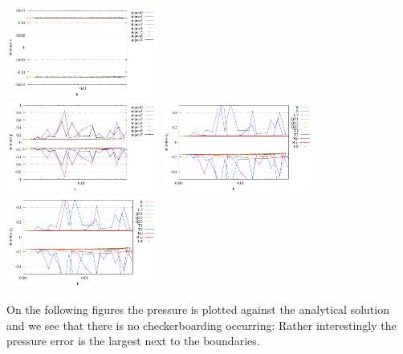 \begin{center}
\includegraphics[width=5cm]{python_codes/fieldstone_78/results/stats_v_exp1.pdf}\\
\includegraphics[width=5cm]{python_codes/fieldstone_78/results/stats_p_exp1.pdf}
\includegraphics[width=5cm]{python_codes/fieldstone_78/results/stats_q1_exp1.pdf}
\includegraphics[width=5cm]{python_codes/fieldstone_78/results/stats_q2_exp1.pdf}
\end{center}

On the following figures the pressure is plotted against the analytical solution and 
we see that there is no checkerboarding occurring:
Rather interestingly the pressure error is the largest next to the boundaries.

